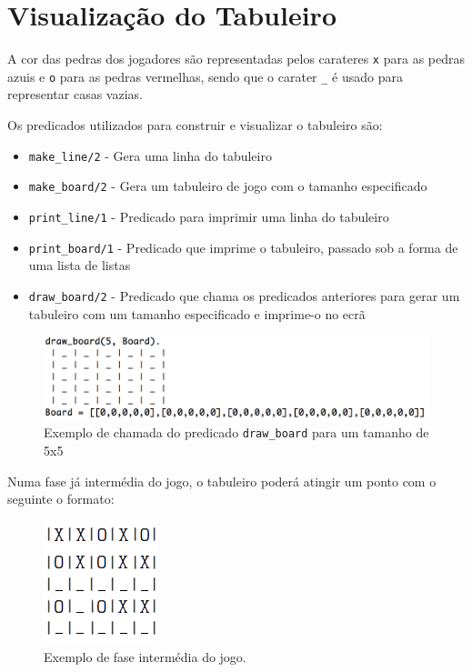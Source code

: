 \documentclass[a4paper]{article}
\begin{document}
\section{Visualização do Tabuleiro}

A cor das pedras dos jogadores são representadas pelos carateres \texttt{x} para as pedras azuis e \texttt{o} para as pedras vermelhas, sendo que o carater \texttt{\_} é usado para representar casas vazias.

Os predicados utilizados para construir e visualizar o tabuleiro são:

\begin{itemize}
	\item \texttt{make\_line/2} - Gera uma linha do tabuleiro
	\item \texttt{make\_board/2} - Gera um tabuleiro de jogo com o tamanho especificado
	\item \texttt{print\_line/1} - Predicado para imprimir uma linha do tabuleiro
	\item \texttt{print\_board/1} - Predicado que imprime o tabuleiro, passado sob a forma de uma lista de listas
	\item \texttt{draw\_board/2} - Predicado que chama os predicados anteriores para gerar um tabuleiro com um tamanho especificado e imprime-o no ecrã
\end{itemize}

\begin{figure}[!htb]
	\centering
	\includegraphics[scale=0.6]{images/draw_board.png}
	\caption{Exemplo de chamada do predicado \texttt{draw\_board} para um tamanho de 5x5}
\end{figure}

Numa fase já intermédia do jogo, o tabuleiro poderá atingir um ponto com o seguinte o formato:

\begin{figure}[!htb]
	\centering
	\includegraphics[scale=0.5]{images/board_prolog.png}
	\caption{Exemplo de fase intermédia do jogo.}
\end{figure}
\end{document}
